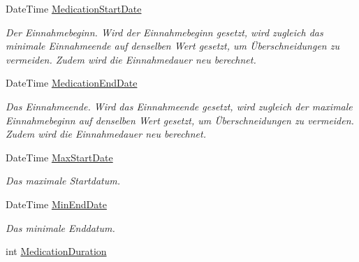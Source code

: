 \begin{DoxyCompactItemize}
Date\+Time \mbox{\hyperlink{classmy_m_d_1_1_view_model_1_1_medication_tab_view_model_1_1_medicine_view_model_a8c2bd69c170ca5aaaf6491824dc5fd16}{Medication\+Start\+Date}}
\begin{DoxyCompactList}\small\item\em Der Einnahmebeginn. Wird der Einnahmebeginn gesetzt, wird zugleich das minimale Einnahmeende auf denselben Wert gesetzt, um Überschneidungen zu vermeiden. Zudem wird die Einnahmedauer neu berechnet. \end{DoxyCompactList}\item 
Date\+Time \mbox{\hyperlink{classmy_m_d_1_1_view_model_1_1_medication_tab_view_model_1_1_medicine_view_model_aeb953c1be24162e984238210872d23f3}{Medication\+End\+Date}}
\begin{DoxyCompactList}\small\item\em Das Einnahmeende. Wird das Einnahmeende gesetzt, wird zugleich der maximale Einnahmebeginn auf denselben Wert gesetzt, um Überschneidungen zu vermeiden. Zudem wird die Einnahmedauer neu berechnet. \end{DoxyCompactList}\item 
Date\+Time \mbox{\hyperlink{classmy_m_d_1_1_view_model_1_1_medication_tab_view_model_1_1_medicine_view_model_a45ae8e7eacf145d650cd97602a93018b}{Max\+Start\+Date}}
\begin{DoxyCompactList}\small\item\em Das maximale Startdatum. \end{DoxyCompactList}\item 
Date\+Time \mbox{\hyperlink{classmy_m_d_1_1_view_model_1_1_medication_tab_view_model_1_1_medicine_view_model_aee4be6017890f4b46f9adf50f0327322}{Min\+End\+Date}}
\begin{DoxyCompactList}\small\item\em Das minimale Enddatum. \end{DoxyCompactList}\item 
int \mbox{\hyperlink{classmy_m_d_1_1_view_model_1_1_medication_tab_view_model_1_1_medicine_view_model_ac8ae23533e41015c959f994b4195ef7f}{Medication\+Duration}}

\end{DoxyCompactItemize}
